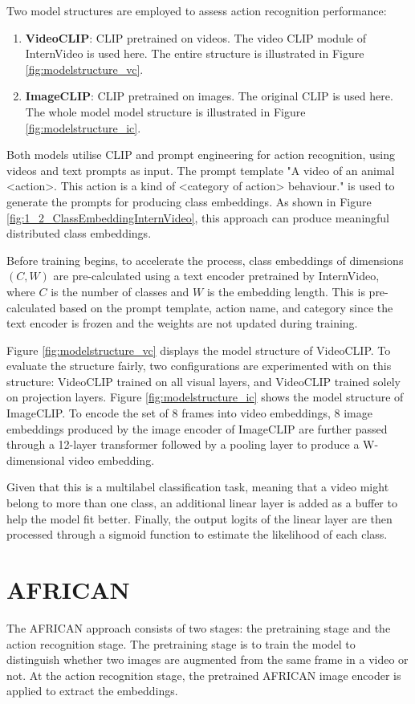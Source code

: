 Two model structures are employed to assess action recognition performance: 
\begin{enumerate}
    \item \textbf{VideoCLIP}: CLIP pretrained on videos. The video CLIP module of InternVideo \parencite{wang2022internvideo} is used here. The entire structure is illustrated in Figure \ref{fig:modelstructure_vc}.
    \item \textbf{ImageCLIP}: CLIP pretrained on images. The original CLIP \parencite{radford2021learning} is used here. The whole model model structure is illustrated in Figure \ref{fig:modelstructure_ic}.
\end{enumerate}

Both models utilise CLIP and prompt engineering for action recognition, using videos and text prompts as input. The prompt template "A video of an animal <action>. This action is a kind of <category of action> behaviour." is used to generate the prompts for producing class embeddings. As shown in Figure \ref{fig:1_2_ClassEmbeddingInternVideo}, this approach can produce meaningful distributed class embeddings.

Before training begins, to accelerate the process, class embeddings of dimensions $(C, W)$ are pre-calculated using a text encoder pretrained by InternVideo, where $C$ is the number of classes and $W$ is the embedding length. This is pre-calculated based on the prompt template, action name, and category since the text encoder is frozen and the weights are not updated during training.

Figure \ref{fig:modelstructure_vc} displays the model structure of VideoCLIP. To evaluate the structure fairly, two configurations are experimented with on this structure: VideoCLIP trained on all visual layers, and VideoCLIP trained solely on projection layers. Figure \ref{fig:modelstructure_ic} shows the model structure of ImageCLIP. To encode the set of 8 frames into video embeddings, 8 image embeddings produced by the image encoder of ImageCLIP are further passed through a 12-layer transformer followed by a pooling layer to produce a W-dimensional video embedding.

Given that this is a multilabel classification task, meaning that a video might belong to more than one class, an additional linear layer is added as a buffer to help the model fit better. Finally, the output logits of the linear layer are then processed through a sigmoid function to estimate the likelihood of each class.

\section{AFRICAN}
The AFRICAN approach consists of two stages: the pretraining stage and the action recognition stage. The pretraining stage is to train the model to distinguish whether two images are augmented from the same frame in a video or not. At the action recognition stage, the pretrained AFRICAN image encoder is applied to extract the embeddings. 

